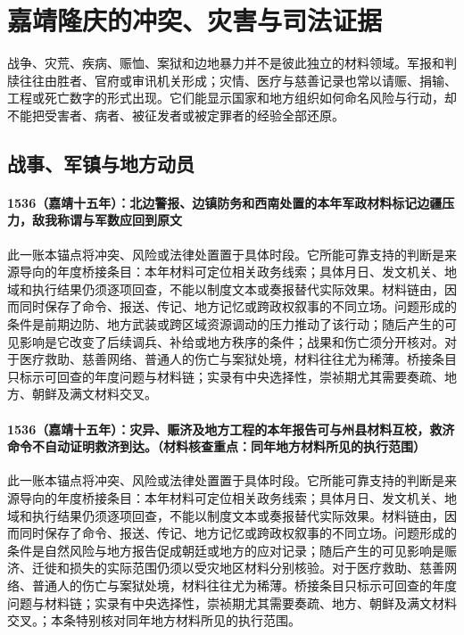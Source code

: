 \section{嘉靖隆庆的冲突、灾害与司法证据}

战争、灾荒、疾病、赈恤、案狱和边地暴力并不是彼此独立的材料领域。军报和判牍往往由胜者、官府或审讯机关形成；灾情、医疗与慈善记录也常以请赈、捐输、工程或死亡数字的形式出现。它们能显示国家和地方组织如何命名风险与行动，却不能把受害者、病者、被征发者或被定罪者的经验全部还原。

\subsection{战事、军镇与地方动员}

\paragraph{1536（嘉靖十五年）：北边警报、边镇防务和西南处置的本年军政材料标记边疆压力，敌我称谓与军数应回到原文} 此一账本锚点将冲突、风险或法律处置置于具体时段。它所能可靠支持的判断是来源导向的年度桥接条目：本年材料可定位相关政务线索；具体月日、发文机关、地域和执行结果仍须逐项回查，不能以制度文本或奏报替代实际效果。材料链由，因而同时保存了命令、报送、传记、地方记忆或跨政权叙事的不同立场。问题形成的条件是前期边防、地方武装或跨区域资源调动的压力推动了该行动；随后产生的可见影响是它改变了后续调兵、补给或地方秩序的条件；战果和伤亡须分开核对。对于医疗救助、慈善网络、普通人的伤亡与案狱处境，材料往往尤为稀薄。桥接条目只标示可回查的年度问题与材料链；实录有中央选择性，崇祯期尤其需要奏疏、地方、朝鲜及满文材料交叉。

\paragraph{1536（嘉靖十五年）：灾异、赈济及地方工程的本年报告可与州县材料互校，救济命令不自动证明救济到达。（材料核查重点：同年地方材料所见的执行范围）} 此一账本锚点将冲突、风险或法律处置置于具体时段。它所能可靠支持的判断是来源导向的年度桥接条目：本年材料可定位相关政务线索；具体月日、发文机关、地域和执行结果仍须逐项回查，不能以制度文本或奏报替代实际效果。材料链由，因而同时保存了命令、报送、传记、地方记忆或跨政权叙事的不同立场。问题形成的条件是自然风险与地方报告促成朝廷或地方的应对记录；随后产生的可见影响是赈济、迁徙和损失的实际范围仍须以受灾地区材料分别核验。对于医疗救助、慈善网络、普通人的伤亡与案狱处境，材料往往尤为稀薄。桥接条目只标示可回查的年度问题与材料链；实录有中央选择性，崇祯期尤其需要奏疏、地方、朝鲜及满文材料交叉。；本条特别核对同年地方材料所见的执行范围。

